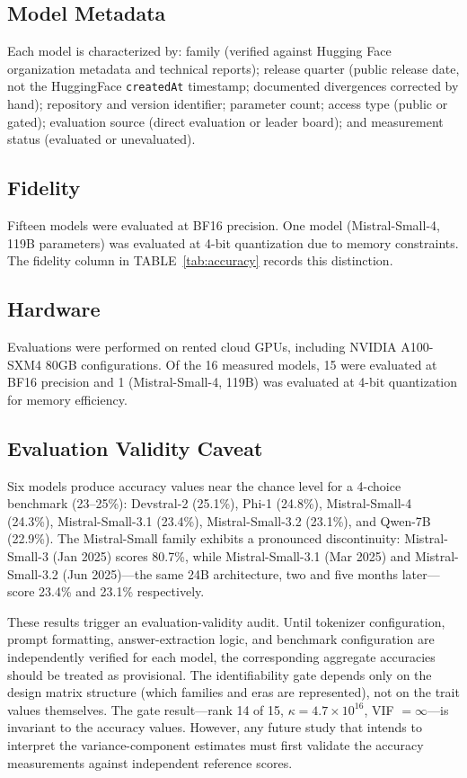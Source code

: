 \documentclass{ieeeaccess}
\theoremstyle{definition}
\theoremstyle{plain}
\begin{document}
\subsection{Model Metadata}
Each model is characterized by: family (verified against Hugging Face organization metadata and technical reports); release quarter (public release date, not the HuggingFace \texttt{createdAt} timestamp; documented divergences corrected by hand); repository and version identifier; parameter count; access type (public or gated); evaluation source (direct evaluation or leader board); and measurement status (evaluated or unevaluated).

\subsection{Fidelity}
Fifteen models were evaluated at BF16 precision. One model (Mistral-Small-4, 119B parameters) was evaluated at 4-bit quantization due to memory constraints. The fidelity column in TABLE~\ref{tab:accuracy} records this distinction.

\subsection{Hardware}
Evaluations were performed on rented cloud GPUs, including NVIDIA A100-SXM4 80GB configurations. Of the 16 measured models, 15 were evaluated at BF16 precision and 1 (Mistral-Small-4, 119B) was evaluated at 4-bit quantization for memory efficiency.

\subsection{Evaluation Validity Caveat}
Six models produce accuracy values near the chance level for a 4-choice benchmark (23--25\%): Devstral-2 (25.1\%), Phi-1 (24.8\%), Mistral-Small-4 (24.3\%), Mistral-Small-3.1 (23.4\%), Mistral-Small-3.2 (23.1\%), and Qwen-7B (22.9\%). The Mistral-Small family exhibits a pronounced discontinuity: Mistral-Small-3 (Jan 2025) scores 80.7\%, while Mistral-Small-3.1 (Mar 2025) and Mistral-Small-3.2 (Jun 2025)---the same 24B architecture, two and five months later---score 23.4\% and 23.1\% respectively.

These results trigger an evaluation-validity audit. Until tokenizer configuration, prompt formatting, answer-extraction logic, and benchmark configuration are independently verified for each model, the corresponding aggregate accuracies should be treated as provisional. The identifiability gate depends only on the design matrix structure (which families and eras are represented), not on the trait values themselves. The gate result---rank 14 of 15, $\kappa = 4.7 \times 10^{16}$, VIF $= \infty$---is invariant to the accuracy values. However, any future study that intends to interpret the variance-component estimates must first validate the accuracy measurements against independent reference scores.
\end{document}
